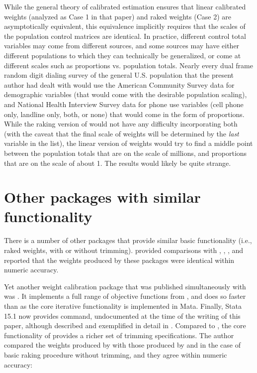 
While the general theory of calibrated estimation \citep{deville:sarndal:1992}
ensures that linear calibrated weights (analyzed as Case 1 in that paper) and
raked weights (Case 2) are asymptotically equivalent, this equivalence implicitly
requires that the scales of the population control matrices are identical.
In practice, different control total variables may come from different sources,
and some sources may have either different populations to which they can technically
be generalized, or come at different scales such as proportions vs. population totals.
Nearly every dual frame random digit dialing survey of the general U.S. population 
that the present author had dealt
with would use the American Community Survey data for demographic variables
(that would come with the desirable population scaling), and National Health Interview Survey
data for phone use variables (cell phone only, landline only, both, or none) that would
come in the form of proportions. While the raking version of  would not
have any difficulty incorporating both (with the caveat that the final scale of weights
will be determined by the \textit{last} variable in the  list),
the linear version of weights would try to find a middle point between the population
totals that are on the scale of millions, and proportions that are on the scale of about 1.
The results would likely be quite strange.

\section{Other packages with similar functionality}
\label{subsec:compare}

There is a number of other packages that provide similar basic functionality
(i.e., raked weights, with or without trimming).
\citet{kolenikov:2014} provided comparisons with
 \citep{winter:2002},  \citep{bergmann:2011},
 \citep{wittenberg:2010}, and reported that the weights
produced by these packages were identical within numeric accuracy.

Yet another weight calibration
package that was published simultaneously with \citet{kolenikov:2014}
was  \citep{pacifico:2014}. It implements a full range
of objective functions from \citet{deville:sarndal:1992}, and does so faster
than  as the core iterative functionality is implemented in Mata.
Finally, Stata 15.1 now provides  command,
undocumented at the time of the writing of this paper, although described
and exemplified in detail in \citet{valliant:dever:2017}. Compared
to , the core functionality of  provides
a richer set of trimming specifications. The author compared the weights
produced by  with those produced by 
and 
in the case of basic raking procedure without trimming, and they agree within
numeric accuracy:

